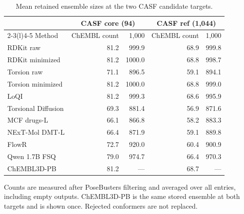 \begin{table}[htbp]
\centering\small
\caption{Mean retained ensemble sizes at the two CASF candidate targets.}
\label{tab:supporting-ensemble-counts}
\begin{tabular}{lrrrr}
\toprule
 & \multicolumn{2}{c}{CASF core (94)} & \multicolumn{2}{c}{CASF ref (1,044)} \\
\cmidrule(lr){2-3}\cmidrule(l){4-5}
Method & ChEMBL count & 1,000 & ChEMBL count & 1,000 \\
\midrule
RDKit raw & 81.2 & 999.9 & 68.9 & 999.8 \\
RDKit minimized & 81.2 & 1000.0 & 68.8 & 998.7 \\
Torsion raw & 71.1 & 896.5 & 59.1 & 894.1 \\
Torsion minimized & 81.2 & 1000.0 & 68.8 & 999.0 \\
LoQI & 81.2 & 999.3 & 68.6 & 995.9 \\
Torsional Diffusion & 69.3 & 881.4 & 56.9 & 871.6 \\
MCF drugs-L & 66.1 & 866.8 & 58.2 & 883.3 \\
NExT-Mol DMT-L & 66.4 & 871.9 & 59.1 & 889.8 \\
FlowR & 72.7 & 920.0 & 60.4 & 900.9 \\
Qwen 1.7B FSQ & 79.0 & 974.7 & 66.4 & 970.3 \\
\hdashline
ChEMBL3D-PB & 81.2 & --- & 68.7 & --- \\
\bottomrule
\end{tabular}
\par\smallskip
\begin{minipage}{\linewidth}
\footnotesize Counts are measured after PoseBusters filtering and averaged over all entries, including empty outputs. ChEMBL3D-PB is the same stored ensemble at both targets and is shown once. Rejected conformers are not replaced.
\end{minipage}
\end{table}
